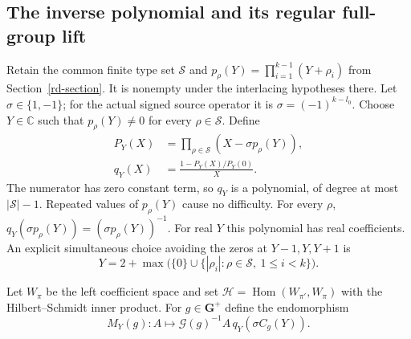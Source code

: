 \subsection{The inverse polynomial and its regular full-group lift}

Retain the common finite type set $\mathcal S$ and
$p_\rho(Y)=\prod_{i=1}^{k-1}(Y+\rho_i)$ from
Section~\ref{rd-section}.  It is nonempty under the
interlacing hypotheses there.
Let $\sigma\in\{1,-1\}$; for the actual signed
source operator it is $\sigma=(-1)^{k-l_0}$.
Choose $Y\in\mathbb C$ such that $p_\rho(Y)\ne0$
for every $\rho\in\mathcal S$.  Define
\begin{align}
 P_Y(X)&=\prod_{\rho\in\mathcal S}
                         (X-\sigma p_\rho(Y)),\nonumber\\
 q_Y(X)&=\frac{1-P_Y(X)/P_Y(0)}{X}. \label{rl-inverse-polynomial}
\end{align}
The numerator has zero constant term, so $q_Y$ is
a polynomial, of degree at most $|\mathcal S|-1$.
Repeated values of $p_\rho(Y)$ cause no difficulty.
For every $\rho$,
$q_Y(\sigma p_\rho(Y))=(\sigma p_\rho(Y))^{-1}$.
For real $Y$ this polynomial has real coefficients.
An explicit simultaneous choice avoiding the zeros
at $Y-1,Y,Y+1$ is
\[
 Y=2+\max\bigl(\{0\}\cup
          \{|\rho_i|:\rho\in\mathcal S,\ 1\leq i<k\}\bigr).
\]

Let $W_\pi$ be the left coefficient space and set
$\mathcal H=\operatorname{Hom}(W_{\pi'},W_\pi)$ with
the Hilbert--Schmidt inner product.
For $g\in\mathbf G^+$ define the endomorphism
\begin{equation}\label{rl-zero-coefficient}
       M_Y(g):A\longmapsto
          \mathcal G(g)^{-1}A\,q_Y(\sigma C_g(Y)).
\end{equation}

